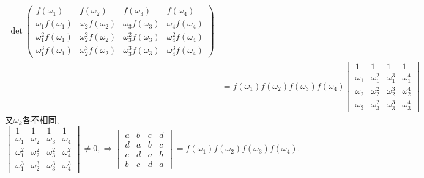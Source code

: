 \documentclass{article}
\begin{document}
\begin{enumerate}
\begin{align*}
        \det
        \begin{pmatrix}
            f(\omega_1) & f(\omega_2) & f(\omega_3) & f(\omega_4)\\
            \omega_1 f(\omega_1) & \omega_2 f(\omega_2) & \omega_3 f(\omega_3) & \omega_4 f(\omega_4)\\
            \omega_1^2 f(\omega_1) & \omega_2^2 f(\omega_2) & \omega_3^2 f(\omega_3) & \omega_4^2 f(\omega_4)\\
            \omega_1^3 f(\omega_1) & \omega_2^3 f(\omega_2) & \omega_3^3 f(\omega_3) & \omega_4^3 f(\omega_4)
        \end{pmatrix}\\
        &=
        f(\omega_1) f(\omega_2) f(\omega_3) f(\omega_4)
        \begin{vmatrix}
            1 & 1 & 1 & 1\\
            \omega_1 & \omega_1^2 & \omega_1^3 & \omega_1^4\\
            \omega_2 & \omega_2^2 & \omega_2^3 & \omega_2^4\\
            \omega_3 & \omega_3^2 & \omega_3^3 & \omega_3^4
        \end{vmatrix}
    \end{align*}
    又$\omega_k$各不相同,
    $\begin{vmatrix}
        1 & 1 & 1 & 1\\
        \omega_1 & \omega_2 & \omega_3 & \omega_4\\
        \omega_1^2 & \omega_2^2 & \omega_3^2 & \omega_4^2\\
        \omega_1^3 & \omega_2^3 & \omega_3^3 & \omega_4^3
    \end{vmatrix}
    \neq 0,\Rightarrow
    \begin{vmatrix}
        a & b & c & d\\
        d & a & b & c\\
        c & d & a & b\\
        b & c & d & a
    \end{vmatrix}=f(\omega_1) f(\omega_2) f(\omega_3) f(\omega_4)
    $.


\end{enumerate}
\end{document}

